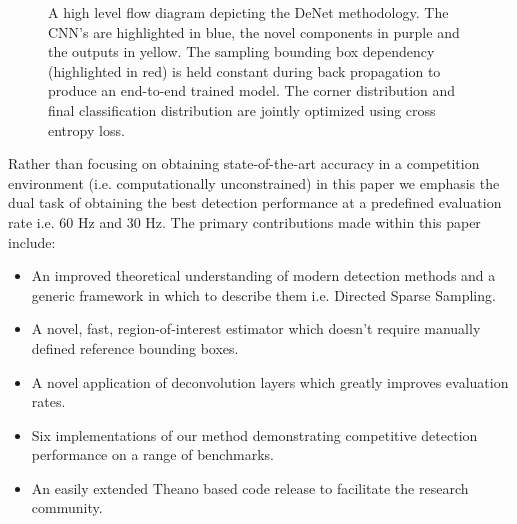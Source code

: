 \documentclass[10pt,twocolumn]{article}
\begin{document}
\begin{figure}[tb]
\centering
{}
\caption{A high level flow diagram depicting the DeNet methodology. The CNN's are highlighted in blue, the novel components in purple and the outputs in yellow. The sampling bounding box dependency  (highlighted in red) is held constant during back propagation to produce an end-to-end trained model. The corner distribution and final classification distribution are jointly optimized using cross entropy loss. }
\end{figure}
\newpage 
Rather than focusing on obtaining state-of-the-art accuracy in a competition environment (i.e. computationally unconstrained) in this paper we emphasis the dual task of obtaining the best detection performance at a predefined evaluation rate i.e. 60 Hz and 30 Hz. The primary contributions made within this paper include:
\begin{itemize}
\item An improved theoretical understanding of modern detection methods and a generic framework in which to describe them i.e. Directed Sparse Sampling.
\item A novel, fast, region-of-interest estimator which doesn't require manually defined reference bounding boxes.  
\item A novel application of deconvolution layers which greatly improves evaluation rates. 
\item Six implementations of our method demonstrating competitive detection performance on a range of benchmarks. 
\item An easily extended Theano based code release to facilitate the research community.
\end{itemize}
\end{document}
